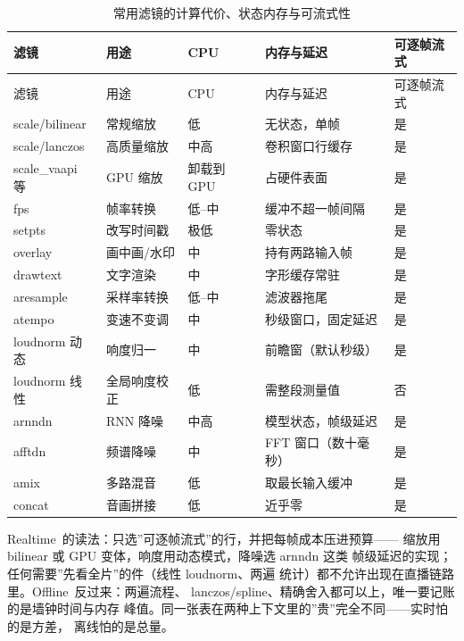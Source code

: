 \documentclass[12pt,a4paper,fontset=fandol]{ctexbook}
\newcommand{\Bk}{\discretionary{}{}{}}
\newcommand{\Lang}[1]{\textsf{#1}}
\newcommand{\DomRT}{\Lang{Realtime}}
\newcommand{\DomBatch}{\Lang{Offline}}
\begin{document}
\small
\begin{longtable}{>{\raggedright\arraybackslash}p{}
                  >{\raggedright\arraybackslash}p{}
                  >{\raggedright\arraybackslash}p{}
                  >{\raggedright\arraybackslash}p{}
                  >{\raggedright\arraybackslash}p{}}
\caption{常用滤镜的计算代价、状态内存与可流式性}\label{tab:ch09-filters} \\
\toprule
滤镜 & 用途 & CPU & 内存与延迟 & 可逐帧流式 \\
\midrule
\endfirsthead
\toprule
滤镜 & 用途 & CPU & 内存与延迟 & 可逐帧流式 \\
\midrule
\endhead
\midrule
\endfoot
\bottomrule
\endlastfoot
scale\Bk/bilinear & 常规缩放 & 低 & 无状态，单帧 & 是 \\
scale\Bk/lanczos & 高质量缩放 & 中高 & 卷积窗口行缓存 & 是 \\
scale\_vaapi 等 & GPU 缩放 & 卸载到 GPU & 占硬件表面 & 是 \\
fps & 帧率转换 & 低--中 & 缓冲不超一帧间隔 & 是 \\
setpts & 改写时间戳 & 极低 & 零状态 & 是 \\
overlay & 画中画/水印 & 中 & 持有两路输入帧 & 是 \\
drawtext & 文字渲染 & 中 & 字形缓存常驻 & 是 \\
aresample & 采样率转换 & 低--中 & 滤波器拖尾 & 是 \\
atempo & 变速不变调 & 中 & 秒级窗口，固定延迟 & 是 \\
loudnorm 动态 & 响度归一 & 中 & 前瞻窗（默认秒级） & 是 \\
loudnorm 线性 & 全局响度校正 & 低 & 需整段测量值 & 否 \\
arnndn & RNN 降噪 & 中高 & 模型状态，帧级延迟 & 是 \\
afftdn & 频谱降噪 & 中 & FFT 窗口（数十毫秒） & 是 \\
amix & 多路混音 & 低 & 取最长输入缓冲 & 是 \\
concat & 音画拼接 & 低 & 近乎零 & 是 \\
\end{longtable}
\normalsize

\DomRT\ 的读法：只选''可逐帧流式''的行，并把每帧成本压进预算——
缩放用 bilinear 或 GPU 变体，响度用动态模式，降噪选 arnndn 这类
帧级延迟的实现；任何需要''先看全片''的件（线性 loudnorm、两遍
统计）都不允许出现在直播链路里。\DomBatch\ 反过来：两遍流程、
lanczos/spline、精确舍入都可以上，唯一要记账的是墙钟时间与内存
峰值。同一张表在两种上下文里的''贵''完全不同——实时怕的是方差，
离线怕的是总量。
\end{document}
